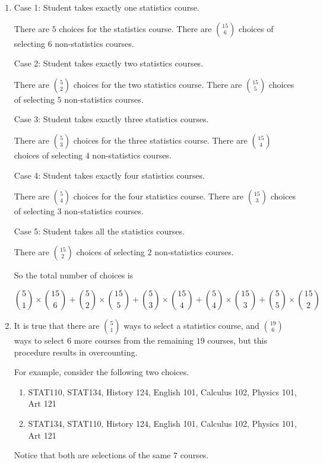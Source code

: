 \begin{enumerate}[label=(\alph*)]
\item Case 1: Student takes exactly one statistics course.
  
  There are $5$ choices for the statistics course. There are ${15 \choose 6}$ choices of selecting $6$ non-statistics courses.
  
  Case 2: Student takes exactly two statistics courses.
  
  There are ${5 \choose 2}$ choices for the two statistics course. There are ${15 \choose 5}$ choices of selecting $5$ non-statistics courses.
  
  Case 3: Student takes exactly three statistics courses.
  
  There are ${5 \choose 3}$ choices for the three statistics course. There are ${15 \choose 4}$ choices of selecting $4$ non-statistics courses.
  
  Case 4: Student takes exactly four statistics courses.
  
  There are ${5 \choose 4}$ choices for the four statistics course. There are ${15 \choose 3}$ choices of selecting $3$ non-statistics courses.
  
  Case 5: Student takes all the statistics courses.
  
  There are ${15 \choose 2}$ choices of selecting $2$ non-statistics courses.
  
  So the total number of choices is
  
  $${5 \choose 1} \times {15 \choose 6} + {5 \choose 2} \times {15 \choose 5} + {5 \choose 3} \times {15 \choose 4} + {5 \choose 4} \times {15 \choose 3} + {5 \choose 5} \times {15 \choose 2}$$

\item It is true that there are ${5 \choose 1}$ ways to select a statistics course, and ${19 \choose 6}$ ways to select $6$ more courses from the remaining $19$ courses, but this procedure results in overcounting.
  
  For example, consider the following two choices.
  
  \begin{enumerate}[label=(\alph*)]
  \item STAT110, STAT134, History 124, English 101, Calculus 102, Physics 101, Art 121
  \item STAT134, STAT110, History 124, English 101, Calculus 102, Physics 101, Art 121
  \end{enumerate}
  
  Notice that both are selections of the same $7$ courses.
\end{enumerate}